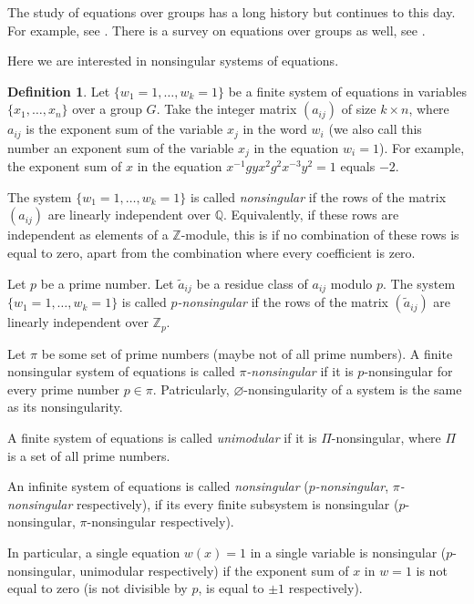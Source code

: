 \documentclass{article}
\theoremstyle{definition}
\newtheorem*{defin}{Definition}
\theoremstyle{remark}
\let\tilde\widetilde
\begin{document}
The study of equations over groups has a long history
but continues to this day. For example, see
\cite{B80, B84, K06, KP95, M24, Sh67, ABA21, BE18, EH91, EH21, EdJu00, 
GR62, How81, IK00, K93, KM23, KMR24, KT17, G83, Le62, NT22, P08, Sh81, T18}.
There is a survey on equations over groups as well, see \cite{Ro12}.

Here we are interested in nonsingular systems of equations.

\begin{defin}
Let $\{w_1=1,\ldots,w_k=1\}$ be
a finite system of equations in variables
$\{x_1,\ldots,x_n\}$
over a group
$G$.
Take the integer matrix
$(a_{ij})$
of size $k \times n$,
where $a_{ij}$ is
the exponent sum of the variable
$x_j$ in the word $w_i$
(we also call this number
an exponent sum of the variable $x_j$
in the equation $w_i=1$).
For example, the exponent sum of $x$
in the equation
$x^{-1}gyx^2g^2x^{-3}y^{2}=1$
equals $-2$.

The system $\{w_1=1,\ldots,w_k=1\}$
is called {\it nonsingular}
if the rows of the matrix $(a_{ij})$
are linearly independent over $\mathbb Q$.
Equivalently, if these rows
are independent as elements of a $\mathbb Z$-module,
this is if no combination of these rows
is equal to zero, apart from the 
combination where every coefficient is zero.

Let $p$ be a prime number.
Let $\tilde a_{ij}$ be a residue
class of $a_{ij}$ modulo $p$.
The system $\{w_1=1,\ldots, w_k=1\}$
is called {\it $p$-nonsingular}
if the rows of the matrix $(\tilde a_{ij})$
are linearly independent over $\mathbb Z_p$.

Let $\pi$ be some set of prime numbers (maybe not of all prime numbers).
A finite nonsingular system of equations is called {\it $\pi$-nonsingular}
if it is $p$-nonsingular for every prime number $p\in\pi$.
Patricularly, $\varnothing$-nonsingularity of a system
is the same as its nonsingularity.

A finite system of equations is called {\it unimodular}
if it is $\Pi$-nonsingular, where $\Pi$ is a set of all prime numbers.

An infinite system of equations
is called {\it nonsingular}
({\it $p$-nonsingular}, {\it $\pi$-nonsingular} respectively),
if its every finite subsystem is nonsingular
($p$-nonsingular, $\pi$-nonsingular respectively).
\end{defin}

In particular, a single equation $w(x)=1$ in
a single variable is nonsingular
($p$-nonsingular, unimodular respectively)
if the exponent sum of $x$ in $w=1$
is not equal to zero
(is not divisible by $p$, is equal to $\pm 1$ respectively).
\end{document}
